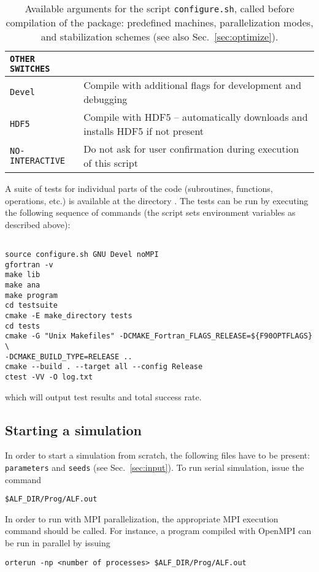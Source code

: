 \begin{table}[!ht]
\begin{center}
\begin{tabular}{@{} p{} p{} @{}}
			\textbf{\texttt{OTHER SWITCHES}} &  \\\midrule
			\texttt{Devel}  &  Compile with additional flags for development and debugging\\
			\texttt{HDF5}  &  Compile with HDF5 -- automatically downloads and installs HDF5 if not present\\
			\texttt{NO-INTERACTIVE} & Do not ask for user confirmation during execution of this script\\
			\bottomrule
		\end{tabular}
		\caption{Available arguments for the script \texttt{configure.sh}, called before compilation of the package: predefined machines, parallelization modes, and stabilization schemes (see also Sec.~\ref{sec:optimize}).} \label{table:configureHPC}
	\end{center}
\end{table}

A suite of tests for individual parts of the code (subroutines, functions, operations, etc.) is available at the directory . The tests can be run by executing the following sequence of commands (the script  sets environment variables as described above):
\begin{lstlisting}[style=bash,morekeywords={make,cmake,ctest}]

source configure.sh GNU Devel noMPI
gfortran -v
make lib
make ana
make program
cd testsuite
cmake -E make_directory tests
cd tests
cmake -G "Unix Makefiles" -DCMAKE_Fortran_FLAGS_RELEASE=${F90OPTFLAGS} \
-DCMAKE_BUILD_TYPE=RELEASE ..
cmake --build . --target all --config Release
ctest -VV -O log.txt
\end{lstlisting}
which will output test results and total success rate.

%
\subsection*{Starting a simulation}
%

In order to start a simulation from scratch, the following files have to be present: \texttt{parameters} and \texttt{seeds} (see Sec.~\ref{sec:input}). 
To run serial simulation, issue the command
\begin{lstlisting}[style=bash]
$ALF_DIR/Prog/ALF.out
\end{lstlisting}
In order to run with MPI parallelization, the appropriate MPI execution command should be called. For instance, a program compiled with OpenMPI can be run in parallel by issuing  
\begin{lstlisting}[style=bash]
orterun -np <number of processes> $ALF_DIR/Prog/ALF.out
\end{lstlisting}

